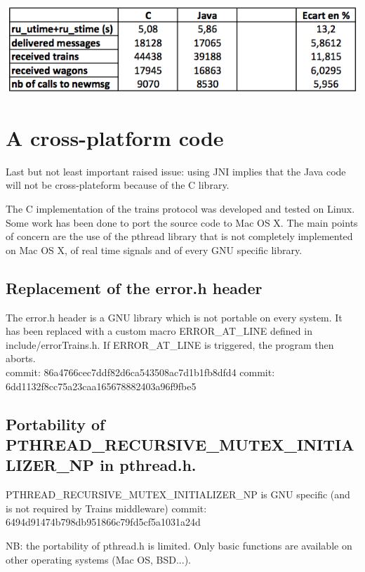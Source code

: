 \documentclass[a4paper,10pt]{report}
\begin{document}
\begin{center}
\includegraphics[scale=0.55]{img/perf.png}\\
\end{center}

\section{A cross-platform code}

Last but not least important raised issue: using JNI implies that the Java code will not be cross-plateform because of the C library.

The C implementation of the trains protocol was developed and tested on Linux. Some work has been done to port the source code
to Mac OS X. The main points of concern are the use of the pthread library that is not completely implemented on Mac OS X, 
of real time signals and of every GNU specific library. 

\subsection{Replacement of the error.h header}
    The error.h header is a GNU library which is not portable on every
    system. It has been replaced with a custom macro ERROR\_AT\_LINE defined
    in include/errorTrains.h.
    If ERROR\_AT\_LINE is triggered, the program then aborts.\\

    commit: 86a4766cec7ddf82d6ca543508ac7d1b1fb8dfd4
    commit: 6dd1132f8cc75a23caa165678882403a96f9fbe5

\subsection{Portability of PTHREAD\_RECURSIVE\_MUTEX\_INITIALIZER\_NP in pthread.h.}

    PTHREAD\_RECURSIVE\_MUTEX\_INITIALIZER\_NP is GNU specific (and
    is not required by Trains middleware)
    commit: 6494d91474b798db951866c79fd5cf5a1031a24d
    
    NB: the portability of pthread.h is limited. Only basic functions are
    available on other operating systems (Mac OS, BSD...).\\
    
\end{document}
